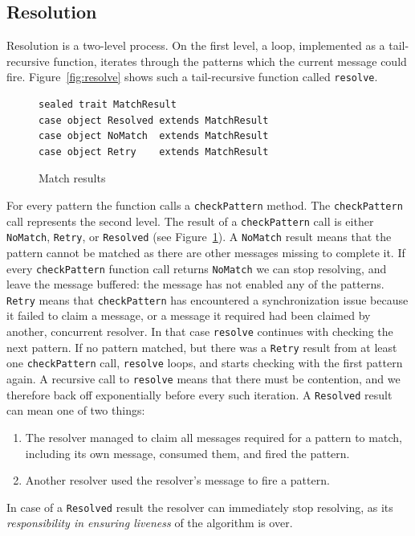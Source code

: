 \documentclass[runningheads]{llncs}
\begin{document}
\begin{sloppypar}
\subsection{Resolution}

Resolution is a two-level process. On the first level, a loop, implemented as
a tail-recursive function, iterates through the patterns which the current
message could fire. Figure~\ref{fig:resolve} shows such a tail-recursive
function called \verb|resolve|.

\begin{figure}[ht]
\centering
\begin{lstlisting}
sealed trait MatchResult
case object Resolved extends MatchResult
case object NoMatch  extends MatchResult
case object Retry    extends MatchResult
\end{lstlisting}
\caption{Match results}
\label{fig:match-results}
\end{figure}

For every pattern the function calls a \verb|checkPattern| method. The
\verb|checkPattern| call represents the second level. The result of a
\verb|checkPattern| call is either \verb|NoMatch|, \verb|Retry|, or
\verb|Resolved| (see Figure~\ref{fig:match-results}). A \texttt{NoMatch}
result means that the pattern cannot be matched as there are other messages
missing to complete it. If every \texttt{checkPattern} function call returns
\texttt{NoMatch} we can stop resolving, and leave the message buffered: the
message has not enabled any of the patterns. \texttt{Retry} means that
\texttt{checkPattern} has encountered a synchronization issue because it
failed to claim a message, or a message it required had been claimed by
another, concurrent resolver. In that case \verb|resolve| continues with
checking the next pattern. If no pattern matched, but there was a
\texttt{Retry} result from at least one \texttt{checkPattern} call,
\verb|resolve| loops, and starts checking with the first pattern again. A
recursive call to \verb|resolve| means that there must be contention, and we
therefore back off exponentially before every such iteration. A
\texttt{Resolved} result can mean one of two things:

\begin{enumerate}
\item The resolver managed to claim all messages required for a pattern
      to match, including its own message, consumed them, and fired the
      pattern.
\item Another resolver used the resolver's message to fire a pattern.
\end{enumerate}
\noindent
In case of a \texttt{Resolved} result the resolver can immediately stop
resolving, as its {\em responsibility in ensuring liveness} of the algorithm
is over.


\end{sloppypar}
\end{document}
